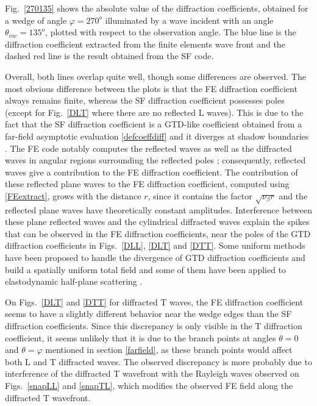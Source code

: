Fig.~\ref{270135} shows the absolute value of the diffraction coefficients, obtained for a wedge of angle $\varphi=270^o$ illuminated by a wave incident with an angle $\theta_{inc}=135^o$, plotted with respect to the observation angle. The blue line is the diffraction coefficient extracted from the finite elements wave front and the dashed red line is the result obtained from the SF code. 

Overall, both lines overlap quite well, though some differences are observed. The most obvious difference between the plots is that the FE diffraction coefficient always remains finite, whereas the SF diffraction coefficient possesses poles (except for Fig.~\ref{DLT} where there are no reflected L waves). This is due to the fact that the SF diffraction coefficient is a GTD-like coefficient obtained from a far-field asymptotic evaluation \eqref{defcoeffdiff} and it diverges at shadow boundaries \cite{GTD,Audrey}. The FE code notably computes the reflected waves as well as the diffracted waves in angular regions surrounding the reflected poles ; consequently, reflected waves give a contribution to the FE diffraction coefficient. The contribution of these reflected plane waves to the FE diffraction coefficient, computed using \eqref{FEextract}, grows with the distance $r$, since it contains the factor $\sqrt{\nu_{\beta}r}$ and the reflected plane waves have theoretically constant amplitudes. Interference between these plane reflected waves and the cylindrical diffracted waves explain the spikes that can be observed in the FE diffraction coefficients, near the poles of the GTD diffraction coefficients in Figs.~\ref{DLL}, \ref{DLT} and \ref{DTT}. Some uniform methods have been proposed to handle the divergence of GTD diffraction coefficients and build a spatially uniform total field and some of them have been applied to elastodynamic half-plane scattering \cite{Audrey, Zernov, PTDdarmon}.

On Figs.~\ref{DLT} and \ref{DTT} for diffracted T waves, the FE diffraction coefficient seems to have a slightly different behavior near the wedge edges than the SF diffraction coefficients. Since this discrepancy is only visible in the T diffraction coefficient, it seems unlikely that it is due to the branch points at angles $\theta=0$ and $\theta=\varphi$ mentioned in section \ref{farfield}, as these branch points would affect both L and T diffracted waves. The observed discrepancy is more probably due to interference of the diffracted T wavefront with the Rayleigh waves observed on Figs.~\ref{snapLL} and \ref{snapTL}, which modifies the observed FE field along the diffracted T wavefront.


